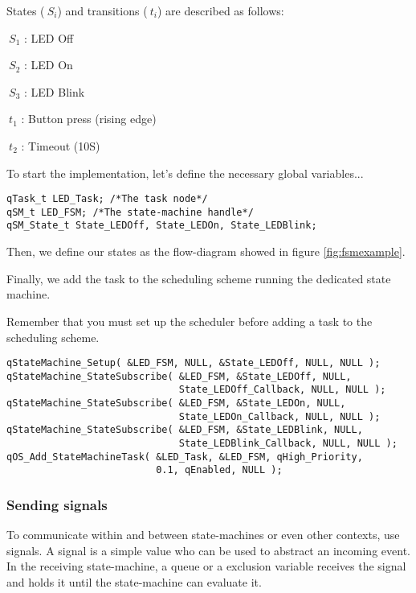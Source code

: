 States ($\ S_i$) and transitions ($\ t_i$) are described as follows: 
\medskip
\begin{itemize}
\begin{minipage}{0.4\linewidth}
    \item $\ S_1$ : LED Off
    \item $\ S_2$ : LED On
    \item $\ S_3$ : LED Blink
\end{minipage}
\begin{minipage}{0.4\linewidth}
    \item $\ t_1$ : Button press (rising edge)
    \item $\ t_2$ : Timeout (10S)
\end{minipage}
\end{itemize}



To start the implementation, let's define the necessary global variables...

\begin{lstlisting}[style=CStyle]
qTask_t LED_Task; /*The task node*/
qSM_t LED_FSM; /*The state-machine handle*/
qSM_State_t State_LEDOff, State_LEDOn, State_LEDBlink;
\end{lstlisting}

Then, we define our states as the flow-diagram showed in figure \ref{fig:fsmexample}.



Finally, we add the task to the scheduling scheme running the dedicated state machine.

Remember that you must set up the scheduler before adding a task to the scheduling scheme.
\medskip

\begin{lstlisting}[style=CStyle]
qStateMachine_Setup( &LED_FSM, NULL, &State_LEDOff, NULL, NULL ); 
qStateMachine_StateSubscribe( &LED_FSM, &State_LEDOff, NULL, 
                              State_LEDOff_Callback, NULL, NULL ); 
qStateMachine_StateSubscribe( &LED_FSM, &State_LEDOn, NULL, 
                              State_LEDOn_Callback, NULL, NULL );
qStateMachine_StateSubscribe( &LED_FSM, &State_LEDBlink, NULL, 
                              State_LEDBlink_Callback, NULL, NULL ); 
qOS_Add_StateMachineTask( &LED_Task, &LED_FSM, qHigh_Priority, 
                          0.1, qEnabled, NULL );
\end{lstlisting}


\subsubsection{Sending signals}
To communicate within and between state-machines or even other contexts, use signals. A signal is a simple value who can be used to abstract an incoming event. In the receiving state-machine, a queue or a exclusion variable receives the signal and holds it until the state-machine can evaluate it.


